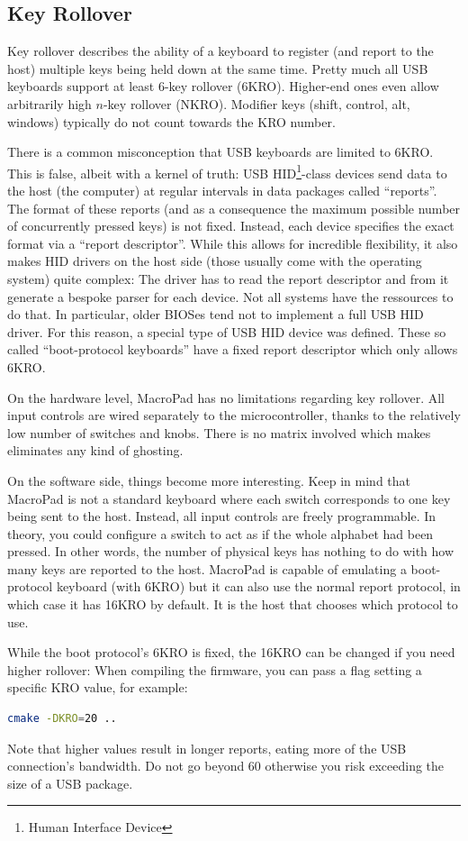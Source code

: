 \documentclass{article}
\begin{document}
\subsection{Key Rollover}
Key rollover describes the ability of a keyboard to register (and report to the host) multiple keys being held down at the same time. Pretty much all USB keyboards support at least 6-key rollover (6KRO). Higher-end ones even allow arbitrarily high $n$-key rollover (NKRO). Modifier keys (shift, control, alt, windows) typically do not count towards the KRO number.

There is a common misconception that USB keyboards are limited to 6KRO. This is false, albeit with a kernel of truth: USB HID\footnote{Human Interface Device}-class devices send data to the host (the computer) at regular intervals in data packages called ``reports''. The format of these reports (and as a consequence the maximum possible number of concurrently pressed keys) is not fixed. Instead, each device specifies the exact format via a ``report descriptor''. While this allows for incredible flexibility, it also makes HID drivers on the host side (those usually come with the operating system) quite complex: The driver has to read the report descriptor and from it generate a bespoke parser for each device. Not all systems have the ressources to do that. In particular, older BIOSes tend not to implement a full USB HID driver. For this reason, a special type of USB HID device was defined. These so called ``boot-protocol keyboards'' have a fixed report descriptor which only allows 6KRO.

On the hardware level, MacroPad has no limitations regarding key rollover. All input controls are wired separately to the microcontroller, thanks to the relatively low number of switches and knobs. There is no matrix involved which makes eliminates any kind of ghosting.

On the software side, things become more interesting. Keep in mind that MacroPad is not a standard keyboard where each switch corresponds to one key being sent to the host. Instead, all input controls are freely programmable. In theory, you could configure a switch to act as if the whole alphabet had been pressed. In other words, the number of physical keys has nothing to do with how many keys are reported to the host.
MacroPad is capable of emulating a boot-protocol keyboard (with 6KRO) but it can also use the normal report protocol, in which case it has 16KRO by default. It is the host that chooses which protocol to use.

While the boot protocol's 6KRO is fixed, the 16KRO can be changed if you need higher rollover: When compiling the firmware, you can pass a flag setting a specific KRO value, for example:
\begin{lstlisting}[language=bash]
cmake -DKRO=20 ..
\end{lstlisting}
Note that higher values result in longer reports, eating more of the USB connection's bandwidth. Do not go beyond 60 otherwise you risk exceeding the size of a USB package. 
\end{document}
